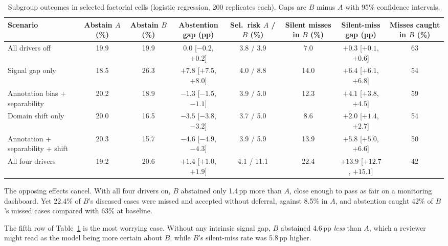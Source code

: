 \documentclass[conference]{IEEEtran}
\newcommand{\pp}{\,pp}
\begin{document}
\begin{table}[t]
\centering
\caption{Subgroup outcomes in selected factorial cells (logistic regression, 200 replicates each). Gaps are $B$ minus $A$ with 95\% confidence intervals.}
\label{tab:scen}
\footnotesize
\setlength{\tabcolsep}{4pt}
\begin{tabular}{@{}lccccccc@{}}
\toprule
Scenario & \shortstack{Abstain\\$A$ (\%)} & \shortstack{Abstain\\$B$ (\%)} & \shortstack{Abstention\\gap (pp)} & \shortstack{Sel.\ risk\\$A$ / $B$ (\%)} & \shortstack{Silent misses\\in $B$ (\%)} & \shortstack{Silent-miss\\gap (pp)} & \shortstack{Misses caught\\in $B$ (\%)} \\
\midrule
All drivers off & 19.9 & 19.9 & $0.0$ [$-0.2$, $+0.2$] & 3.8 / 3.9 & 7.0 & $+0.3$ [$+0.1$, $+0.6$] & 63 \\
Signal gap only & 18.5 & 26.3 & $+7.8$ [$+7.5$, $+8.0$] & 4.0 / 8.8 & 14.0 & $+6.4$ [$+6.1$, $+6.8$] & 54 \\
Annotation bias + separability & 20.2 & 18.9 & $-1.3$ [$-1.5$, $-1.1$] & 3.9 / 5.0 & 12.3 & $+4.1$ [$+3.8$, $+4.5$] & 59 \\
Domain shift only & 20.0 & 16.5 & $-3.5$ [$-3.8$, $-3.2$] & 3.7 / 5.0 & 8.6 & $+2.0$ [$+1.4$, $+2.7$] & 54 \\
Annotation + separability + shift & 20.3 & 15.7 & $-4.6$ [$-4.9$, $-4.3$] & 3.9 / 5.9 & 13.9 & $+5.8$ [$+5.0$, $+6.6$] & 50 \\
All four drivers & 19.2 & 20.6 & $+1.4$ [$+1.0$, $+1.9$] & 4.1 / 11.1 & 22.4 & $+13.9$ [$+12.7$, $+15.1$] & 42 \\
\bottomrule
\end{tabular}
\end{table}

The opposing effects cancel. With all four drivers on, $B$ abstained only 1.4\pp{} more than $A$, close enough to pass as fair on a monitoring dashboard. Yet 22.4\% of $B$'s diseased cases were missed and accepted without deferral, against 8.5\% in $A$, and abstention caught 42\% of $B$'s missed cases compared with 63\% at baseline.

The fifth row of Table~\ref{tab:scen} is the most worrying case. Without any intrinsic signal gap, $B$ abstained 4.6\pp{} \emph{less} than $A$, which a reviewer might read as the model being more certain about $B$, while $B$'s silent-miss rate was 5.8\pp{} higher.
\end{document}
